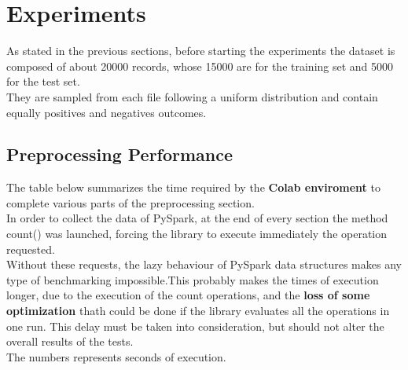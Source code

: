 \documentclass[
	letterpaper, %
	10pt, %
]{class}
\begin{document}


\section{Experiments}

As stated in the previous sections, before starting the experiments the dataset is composed of about 20000 records, whose 15000 are for the training set and 5000 for the test set.\\
They are sampled from each file following a uniform distribution and contain equally positives and negatives outcomes.

\subsection{Preprocessing Performance}

The table below summarizes the time required by the \textbf{Colab enviroment} to complete various parts of the preprocessing section.\\

In order to collect the data of PySpark, at the end of every section the method count() was launched, forcing the library to execute immediately the operation requested.\\

Without these requests, the lazy behaviour of PySpark data structures makes any type of benchmarking impossible.This probably makes the times of execution longer, due to
the execution of the count operations, and the \textbf{loss of some optimization} thath could be done if the library evaluates all the operations in one run.
This delay must be taken into consideration, but should not alter the overall results of the tests.\\

The numbers represents seconds of execution.
\end{document}
